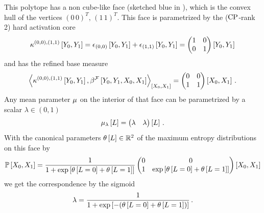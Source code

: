 \begin{example}
    This polytope has a non cube-like face (sketched blue in ), which is the convex hull of the vertices $(0 \, 0)^T, \, (1 \, 1)^T$.
    This face is parametrized by the ($\mathrm{CP}$-rank 2) hard activation core
    \begin{align*}
        \kappa^{(0,0),(1,1)}\left[Y_{0},Y_{1}\right] =
        \epsilon_{(0,0)}\left[Y_{0},Y_{1}\right]
        + \epsilon_{(1,1)}\left[Y_{0},Y_{1}\right] =
        \begin{pmatrix} 
            1 & 0 \\
            0 & 1
         \end{pmatrix}\left[Y_{0},Y_{1}\right]
    \end{align*}
    and has the refined base measure
    \begin{align*}
        \contractionof{\kcoreofat{(0,0),(1,1)}{\headvariableof{0},\headvariableof{1}}
            ,\bencodingofat{\formulaset}{\headvariableof{0},\headvariableof{1},\catvariableof{0},\catvariableof{1}}}{\catvariableof{0},\catvariableof{1}}
        =  \coloredmatrixof{
            0 & 0 \\
            1 & 1
        }{\catvariableof{0},\catvariableof{1}}  \, .
    \end{align*}
    Any mean parameter $\mu$ on the interior of that face can be parametrized by a scalar $\lambda\in(0,1)$
    \begin{align*}
        \mu_{\lambda}\left[L\right] =
        \begin{pmatrix} \lambda & \lambda \end{pmatrix}\left[L\right] \, .
    \end{align*}
    With the canonical parameters $\theta\left[L\right]\in\mathbb{R}^2$ of the maximum entropy distributions on this face by
    \begin{align*}
        \mathbb{P}\left[X_{0},X_{1}\right] =
        \frac{1}{1+\mathrm{exp}\left[\theta\left[L=0\right]+\theta\left[L=1\right]\right]}
        \begin{pmatrix} 
            0 & 0                                                               \\
            1 & \mathrm{exp}\left[\theta\left[L=0\right]+\theta\left[L=1\right]\right]
         \end{pmatrix}\left[X_{0},X_{1}\right]
    \end{align*}
    we get the correspondence by the sigmoid
    \begin{align*}
        \lambda = \frac{1}{1+\mathrm{exp}\left[-(\theta\left[L=0\right]+\theta\left[L=1\right])\right]} \, .
    \end{align*}


\end{example}
